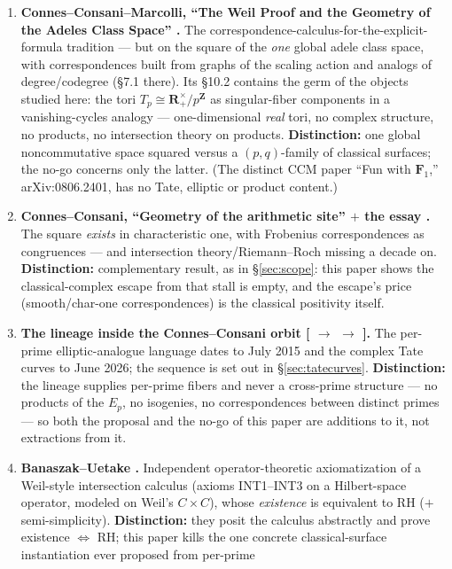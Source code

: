 \documentclass[11pt]{article}
\theoremstyle{definition}
\theoremstyle{remark}
\newcommand{\Z}{\mathbf{Z}}
\newcommand{\R}{\mathbf{R}}
\begin{document}
\begin{enumerate}
\item \textbf{Connes--Consani--Marcolli, ``The Weil Proof and the Geometry
of the Adeles Class Space'' \cite{CCM07}.} The
correspondence-calculus-for-the-explicit-formula tradition --- but on the
square of the \emph{one} global adele class space, with correspondences
built from graphs of the scaling action and analogs of degree/codegree
(\S7.1 there). Its \S10.2 contains the germ of the objects studied here: the
tori $T_p \cong \R^\times_{+}/p^\Z$ as singular-fiber components in a
vanishing-cycles analogy --- one-dimensional \emph{real} tori, no complex
structure, no products, no intersection theory on products.
\textbf{Distinction:} one global noncommutative space squared versus a
$(p,q)$-family of classical surfaces; the no-go concerns only the latter.
(The distinct CCM paper ``Fun with $\mathbf{F}_1$,'' arXiv:0806.2401, has no
Tate, elliptic or product content.)
\item \textbf{Connes--Consani, ``Geometry of the arithmetic site''
\cite{CC16} $+$ the essay \cite[\S4.3.2]{CE15}.} The square
\emph{exists} in characteristic one, with Frobenius correspondences as
congruences --- and intersection theory/Riemann--Roch missing a decade on.
\textbf{Distinction:} complementary result, as in \S\ref{sec:scope}: this
paper shows the classical-complex escape from that stall is empty, and the
escape's price (smooth/char-one correspondences) is the classical positivity
itself.
\item \textbf{The lineage inside the Connes--Consani orbit
[\cite{CC16b, CC17} $\to$ \cite{CC25} $\to$ \cite{CC26}].} The per-prime
elliptic-analogue language dates to July 2015 and the complex Tate curves to
June 2026; the sequence is set out in \S\ref{sec:tatecurves}.
\textbf{Distinction:} the lineage supplies per-prime fibers and never a
cross-prime structure --- no products of the $E_p$, no isogenies, no
correspondences between distinct primes --- so both the proposal and the
no-go of this paper are additions to it, not extractions from it.
\item \textbf{Banaszak--Uetake \cite{BU1, BU2, BU3}.} Independent
operator-theoretic axiomatization of a Weil-style intersection calculus
(axioms INT1--INT3 on a Hilbert-space operator, modeled on Weil's
$C \times C$), whose \emph{existence} is equivalent to RH ($+$
semi-simplicity). \textbf{Distinction:} they posit the calculus abstractly
and prove existence $\Longleftrightarrow$ RH; this paper kills the one
concrete classical-surface instantiation ever proposed from per-prime

\end{enumerate}
\end{document}
